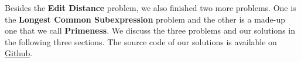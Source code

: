 Besides the {\bf Edit Distance} problem, we also finished two more problems.
One is the {\bf Longest Common Subexpression} problem and the other is
a made-up one that we call {\bf Primeness}. We discuss the three problems
and our solutions in the following three sections.
The source code of our solutions is available on
\href{https://github.com/jzhou76/csc481-project}{Github}.
